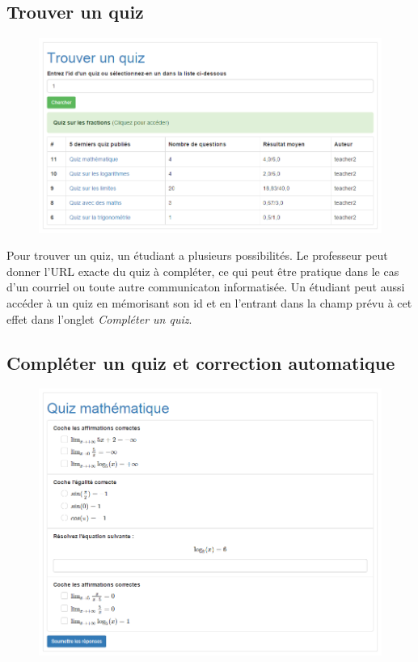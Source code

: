 \documentclass[a4,10pt,french]{sphinxmanual}
\begin{document}
\subsection{Trouver un quiz}
\label{doc-user:trouver-un-quiz}\begin{figure}[htbp]
\centering

\includegraphics{find.png}
\end{figure}

Pour trouver un quiz, un étudiant a plusieurs possibilités. Le professeur peut donner l'URL exacte du quiz à compléter, ce qui peut être pratique dans le cas d'un courriel ou toute autre communicaton informatisée. Un étudiant peut aussi accéder à un quiz en mémorisant son id et en l'entrant dans la champ prévu à cet effet dans l'onglet \emph{Compléter un quiz}.


\subsection{Compléter un quiz et correction automatique}
\label{doc-user:completer-un-quiz-et-correction-automatique}\begin{figure}[htbp]
\centering

\includegraphics{complete.png}
\end{figure}
\end{document}
